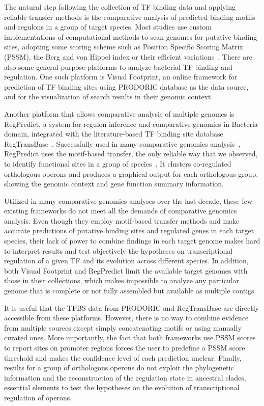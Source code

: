 \documentclass[12pt]{article}
\begin{document}
The natural step following the collection of TF binding data and applying
reliable transfer methods is the comparative analysis of predicted binding
motifs and regulons in a group of target species. Most studies use custom
implementations of computational methods to scan genomes for putative binding
sites, adopting some scoring scheme such as Position Specific Scoring Matrix
(PSSM), the Berg and von Hippel index or their efficient
variations~\cite{schneider1986information, berg1988selection,
  osada2004comparative, beckstette2006fast}. There are also some
general-purpose platforms to analyze bacterial TF binding and regulation. One
such platform is Visual Footprint, an online framework for prediction of TF
binding sites using PRODORIC database as the data source, and for the
visualization of search results in their genomic
context~\cite{munch2005virtual, munch2003prodoric}

Another platform that allows comparative analysis of multiple genomes is
RegPredict, a system for regulon inference and comparative genomics in Bacteria
domain, integrated with the literature-based TF binding site database
RegTransBase~\cite{novichkov2010regpredict,
  kazakov2007regtransbase}. Successfully used in many comparative genomics
analysis~\cite{ravcheev2012transcriptional, antunes2012global,
  novichkov2013regprecise, galperin2014comparative}, RegPredict uses the
motif-based transfer, the only reliable way that we observed, to identify
functional sites in a group of species~\cite{kilic2015assessment}. It clusters
co-regulated orthologous operons and produces a graphical output for each
orthologous group, showing the genomic context and gene function summary
information.

Utilized in many comparative genomics analyses over the last decade, these few
existing frameworks do not meet all the demands of comparative genomics
analysis. Even though they employ motif-based transfer methods and make
accurate predictions of putative binding sites and regulated genes in each
target species, their lack of power to combine findings in each target genome
makes hard to interpret results and test objectively the hypotheses on
transcriptional regulation of a given TF and its evolution across different
species. In addition, both Visual Footprint and RegPredict limit the available
target genomes with those in their collections, which makes impossible to
analyze any particular genome that is complete or not fully assembled but
available as multiple contigs.

It is useful that the TFBS data from PRODORIC and RegTransBase are directly
accessible from these platforms. However, there is no way to combine evidence
from multiple sources except simply concatenating motifs or using manually
curated ones. More importantly, the fact that both frameworks use PSSM scores
to report sites on promoter regions forces the user to predefine a PSSM score
threshold and makes the confidence level of each prediction unclear. Finally,
results for a group of orthologous operons do not exploit the phylogenetic
information and the reconstruction of the regulation state in ancestral clades,
essential elements to test the hypotheses on the evolution of transcriptional
regulation of operons.
\end{document}

